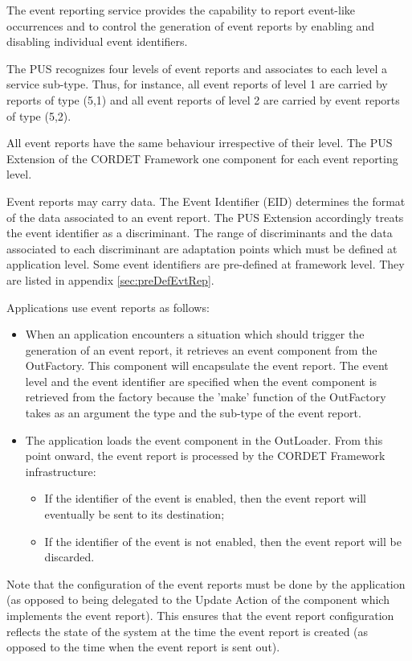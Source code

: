 \documentclass{pnp_article}
\begin{document}
The event reporting service provides the capability to report event-like occurrences and to control the generation of event reports by enabling and disabling individual event identifiers.

The PUS recognizes four levels of event reports and associates to each level a service sub-type. Thus, for instance, all event reports of level 1 are carried by reports of type (5,1) and all event reports of level 2 are carried by event reports of type (5,2). 

All event reports have the same behaviour irrespective of their level. The PUS Extension of the CORDET Framework one component for each event reporting level.

Event reports may carry data. The Event Identifier (EID) determines the format of the data associated to an event report. The PUS Extension accordingly treats the event identifier as a discriminant. The range of discriminants and the data associated to each discriminant are adaptation points which must be defined at application level. Some event identifiers are pre-defined at framework level. They are listed in appendix \ref{sec:preDefEvtRep}.

Applications use event reports as follows:

\begin{itemize}
\item When an application encounters a situation which should trigger the generation of an event report, it retrieves an event component from the OutFactory. This component will encapsulate the event report. The event level and the event identifier are specified when the event component is retrieved from the factory because the 'make' function of the OutFactory takes as an argument the type and the sub-type of the event report.
\item The application loads the event component in the OutLoader. From this point onward, the event report is processed by the CORDET Framework infrastructure:
	\begin{itemize}
	\item If the identifier of the event is enabled, then the event report will eventually be sent to its destination;
	\item If the identifier of the event is not enabled, then the event report will be discarded.
	\end{itemize}
\end{itemize}

Note that the configuration of the event reports must be done by the application (as opposed to being delegated to the Update Action of the component which implements the event report). This ensures that the event report configuration reflects the state of the system at the time the event report is created (as opposed to the time when the event report is sent out).  
\end{document}
